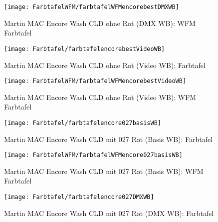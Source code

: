 \documentclass[pagesize,paper=A4,fontsize=12pt,utf8,numbers=noenddot,bibliography=totoc,listof=totoc,DIV=11,BCOR=1mm]{scrreprt}
\begin{document}
\begin{figure}[htp]     %
\centering
\texttt{[image: FarbtafelWFM/farbtafelWFMencorebestDMXWB]} 
\caption {Martin MAC Encore Wash CLD ohne Rot (DMX WB): WFM Farbtafel} 
\end{figure}

\begin{figure}[htp]     %
\centering
\texttt{[image: Farbtafel/farbtafelencorebestVideoWB]} 
\caption {Martin MAC Encore Wash CLD ohne Rot (Video WB): Farbtafel} 
\end{figure}

\begin{figure}[htp]     %
\centering
\texttt{[image: FarbtafelWFM/farbtafelWFMencorebestVideoWB]} 
\caption {Martin MAC Encore Wash CLD ohne Rot (Video WB): WFM Farbtafel} 
\end{figure}




\begin{figure}[htp]     %
\centering
\texttt{[image: Farbtafel/farbtafelencore027basisWB]} 
\caption {Martin MAC Encore Wash CLD mit 027 Rot (Basis WB): Farbtafel} 
\end{figure}

\begin{figure}[htp]     %
\centering
\texttt{[image: FarbtafelWFM/farbtafelWFMencore027basisWB]} 
\caption {Martin MAC Encore Wash CLD mit 027 Rot (Basis WB): WFM Farbtafel} 
\end{figure}

\begin{figure}[htp]     %
\centering
\texttt{[image: Farbtafel/farbtafelencore027DMXWB]} 
\caption {Martin MAC Encore Wash CLD mit 027 Rot (DMX WB): Farbtafel} 
\end{figure}
\end{document}
